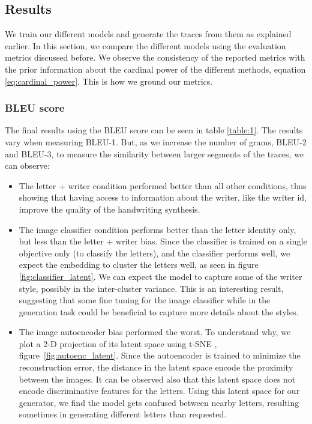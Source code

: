 \subsection{Results}
\par We train our different models and generate the traces from them as explained earlier. In this section, we compare the different models using the evaluation metrics discussed before. We  observe the consistency of the reported metrics with the prior information about the cardinal power of the different methods, equation \ref{eq:cardinal_power}. This is how we ground our metrics.

\subsubsection{BLEU score}
\par The final results using the BLEU score can be seen in table \ref{table:1}. The results vary when measuring BLEU-1. But, as we increase the number of grams, BLEU-2 and BLEU-3, to measure the similarity between larger segments of the traces, we can observe:
\begin{itemize}
    \item The letter + writer condition performed better than all other conditions, thus showing that having access to information about the writer, like the writer id, improve the quality of the handwriting synthesis.
    \item The image classifier condition performs better than the letter identity only, but less than the letter + writer bias. Since the classifier is trained on a single objective only (to classify the letters), and the classifier performs well, we expect the embedding to cluster the letters well, as seen in figure \ref{fig:classifier_latent}. We can expect the model to capture some of the writer style, possibly in the inter-cluster variance. This is an interesting result, suggesting that some fine tuning for the image classifier while in the generation task could be beneficial to capture more details about the styles.
    \item The image autoencoder bias performed the worst. To understand why, we plot a 2-D projection of its latent space using t-SNE \citep{maaten2008visualizing}, figure~\ref{fig:autoenc_latent}. Since the autoencoder is trained to minimize the reconstruction error, the distance in the latent space encode the proximity between the images. It can be observed also that this latent space does not encode discriminative features for the letters. Using this latent space for our generator, we find the model gets confused between nearby letters, resulting sometimes in generating different letters than requested.
\end{itemize}

